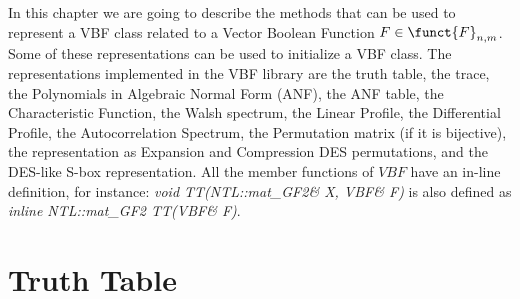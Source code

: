 In this chapter we are going to describe the methods that can be used to represent a VBF class related to a Vector Boolean Function $F \in \funct{F}_{n,m}$. Some of these representations can be used to initialize a VBF class. The representations implemented in the VBF library are the truth table, the trace, the Polynomials in Algebraic Normal Form (ANF), the ANF table, 
the Characteristic Function, the Walsh spectrum, the Linear Profile, the Differential Profile, the Autocorrelation Spectrum, the Permutation matrix (if it is bijective),
the representation as Expansion and Compression DES permutations, and the DES-like S-box representation. All the member functions of $VBF$ have an in-line definition, for instance: \textsl{void TT(NTL::mat\_GF2\& X, VBF\& F)} is also defined as \textsl{inline NTL::mat\_GF2 TT(VBF\& F)}. 

\section{Truth Table}

